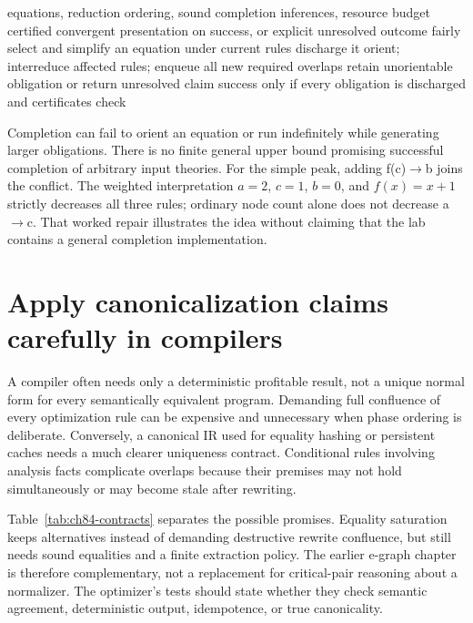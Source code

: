 \begin{algorithm}[htbp]
\caption{Attempt completion while retaining orientation and overlap obligations.}
\label{alg:ch84-completion}
\begin{pseudocode}
\Require equations, reduction ordering, sound completion inferences, resource budget
\Ensure certified convergent presentation on success, or explicit unresolved outcome
\State fairly select and simplify an equation under current rules
 \State discharge it
\State orient; interreduce affected rules; enqueue all new required overlaps
\Else \State retain unorientable obligation or return unresolved
\EndIf
\EndWhile
\State claim success only if every obligation is discharged and certificates check
\end{pseudocode}
\end{algorithm}

Completion can fail to orient an equation or run indefinitely while generating larger obligations.
There is no finite general upper bound promising successful completion of arbitrary input theories.
For the simple peak, adding f(c)$\to$b joins the conflict.
The weighted interpretation $a=2$, $c=1$, $b=0$, and $f(x)=x+1$ strictly decreases all three rules; ordinary node count alone does not decrease a$\to$c.
That worked repair illustrates the idea without claiming that the lab contains a general completion implementation.

\section{Apply canonicalization claims carefully in compilers}
\label{sec:ch84-compilers}
A compiler often needs only a deterministic profitable result, not a unique normal form for every semantically equivalent program.
Demanding full confluence of every optimization rule can be expensive and unnecessary when phase ordering is deliberate.
Conversely, a canonical IR used for equality hashing or persistent caches needs a much clearer uniqueness contract.
Conditional rules involving analysis facts complicate overlaps because their premises may not hold simultaneously or may become stale after rewriting.

Table~\ref{tab:ch84-contracts} separates the possible promises.
Equality saturation keeps alternatives instead of demanding destructive rewrite confluence, but still needs sound equalities and a finite extraction policy.
The earlier e-graph chapter is therefore complementary, not a replacement for critical-pair reasoning about a normalizer.
The optimizer's tests should state whether they check semantic agreement, deterministic output, idempotence, or true canonicality.

